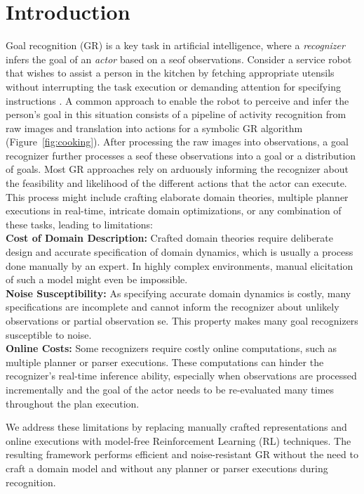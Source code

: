 \documentclass[letterpaper]{article} %
\begin{document}
\section{Introduction}
\label{sec:intro}
Goal recognition (GR) is a key task in artificial intelligence, where a \textit{recognizer} infers the goal of an \textit{actor} based on a seof observations.
Consider a service robot that wishes to assist a person in the kitchen by fetching appropriate utensils without interrupting the task execution or demanding attention for specifying instructions \cite{kautz1986generalized,Monteiro2017,granada2020object,bishop2020chaopt}.
A common approach to enable the robot to perceive and infer the person's goal in this situation consists of a pipeline of activity recognition from raw images and translation into actions for a symbolic GR algorithm (Figure~\ref{fig:cooking}).
After processing the raw images into observations, a goal recognizer further processes a seof these observations into a goal or a distribution of goals.
Most GR approaches rely on arduously informing the recognizer about the feasibility and likelihood of the different actions that the actor can execute.
This process might include crafting elaborate domain theories, multiple planner executions in real-time, intricate domain optimizations, or any combination of these tasks, leading to limitations:\\
\textbf{Cost of Domain Description:} Crafted domain theories require deliberate design and accurate specification of domain dynamics, which is usually a process done manually by an expert.
In highly complex environments, manual elicitation of such a model might even be impossible.\\
\textbf{Noise Susceptibility:} As specifying accurate domain dynamics is costly, many specifications are incomplete and cannot inform the recognizer about unlikely observations or partial observation se.
This property makes many goal recognizers susceptible to noise. \\
\textbf{Online Costs:} Some recognizers require costly online computations, such as multiple planner or parser executions. These computations can hinder the recognizer's real-time inference ability, especially when observations are processed incrementally and the goal of the actor needs to be re-evaluated many times throughout the plan execution.

We address these limitations by replacing manually crafted representations and online executions with model-free Reinforcement Learning (RL) techniques.
The resulting framework performs efficient and noise-resistant GR without the need to craft a domain model and without any planner or parser executions during recognition.
\end{document}
